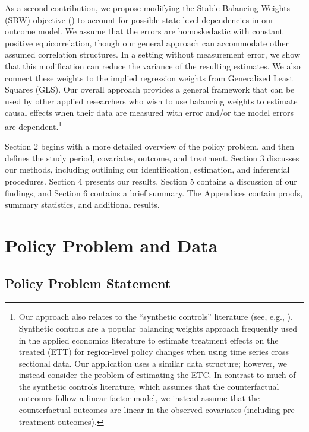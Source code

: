 \documentclass[aoas]{imsart}
\theoremstyle{plain}
\theoremstyle{remark}
\begin{document}
As a second contribution, we propose modifying the Stable Balancing Weights (SBW) objective (\cite{zubizarreta2015stable}) to account for possible state-level dependencies in our outcome model. We assume that the errors are homoskedastic with constant positive equicorrelation, though our general approach can accommodate other assumed correlation structures. In a setting without measurement error, we show that this modification can reduce the variance of the resulting estimates. We also connect these weights to the implied regression weights from Generalized Least Squares (GLS). Our overall approach provides a general framework that can be used by other applied researchers who wish to use balancing weights to estimate causal effects when their data are measured with error and/or the model errors are dependent.\footnote{Our approach also relates to the ``synthetic controls'' literature (see, e.g., \cite{abadie2010synthetic}). Synthetic controls are a popular balancing weights approach frequently used in the applied economics literature to estimate treatment effects on the treated (ETT) for region-level policy changes when using time series cross sectional data. Our application uses a similar data structure; however, we instead consider the problem of estimating the ETC. In contrast to much of the synthetic controls literature, which assumes that the counterfactual outcomes follow a linear factor model, we instead assume that the counterfactual outcomes are linear in the observed covariates (including pre-treatment outcomes).}

Section 2 begins with a more detailed overview of the policy problem, and then defines the study period, covariates, outcome, and treatment. Section 3 discusses our methods, including outlining our identification, estimation, and inferential procedures. Section 4 presents our results. Section 5 contains a discussion of our findings, and Section 6 contains a brief summary. The Appendices contain proofs, summary statistics, and additional results.

\section{Policy Problem and Data}

\subsection{Policy Problem Statement}
\end{document}
